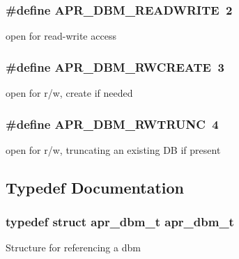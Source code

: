 \subsubsection[{\texorpdfstring{A\+P\+R\+\_\+\+D\+B\+M\+\_\+\+R\+E\+A\+D\+W\+R\+I\+TE}{APR_DBM_READWRITE}}]{\setlength{\rightskip}{0pt plus 5cm}\#define A\+P\+R\+\_\+\+D\+B\+M\+\_\+\+R\+E\+A\+D\+W\+R\+I\+TE~2}\hypertarget{group__APR__Util__DBM_gaf693166e76d6f84b12a0d75307687053}{}\label{group__APR__Util__DBM_gaf693166e76d6f84b12a0d75307687053}
open for read-\/write access 
\subsubsection[{\texorpdfstring{A\+P\+R\+\_\+\+D\+B\+M\+\_\+\+R\+W\+C\+R\+E\+A\+TE}{APR_DBM_RWCREATE}}]{\setlength{\rightskip}{0pt plus 5cm}\#define A\+P\+R\+\_\+\+D\+B\+M\+\_\+\+R\+W\+C\+R\+E\+A\+TE~3}\hypertarget{group__APR__Util__DBM_gabf461a27dab1f4cc7405e891d2ad6522}{}\label{group__APR__Util__DBM_gabf461a27dab1f4cc7405e891d2ad6522}
open for r/w, create if needed 
\subsubsection[{\texorpdfstring{A\+P\+R\+\_\+\+D\+B\+M\+\_\+\+R\+W\+T\+R\+U\+NC}{APR_DBM_RWTRUNC}}]{\setlength{\rightskip}{0pt plus 5cm}\#define A\+P\+R\+\_\+\+D\+B\+M\+\_\+\+R\+W\+T\+R\+U\+NC~4}\hypertarget{group__APR__Util__DBM_ga8bffe207158704162c24fa74dc1b9264}{}\label{group__APR__Util__DBM_ga8bffe207158704162c24fa74dc1b9264}
open for r/w, truncating an existing DB if present 

\subsection{Typedef Documentation}
\subsubsection[{\texorpdfstring{apr\+\_\+dbm\+\_\+t}{apr_dbm_t}}]{\setlength{\rightskip}{0pt plus 5cm}typedef struct {\bf apr\+\_\+dbm\+\_\+t} {\bf apr\+\_\+dbm\+\_\+t}}\hypertarget{group__APR__Util__DBM_ga47f6ff771143ed7b7987c686c20c8536}{}\label{group__APR__Util__DBM_ga47f6ff771143ed7b7987c686c20c8536}
Structure for referencing a dbm 

